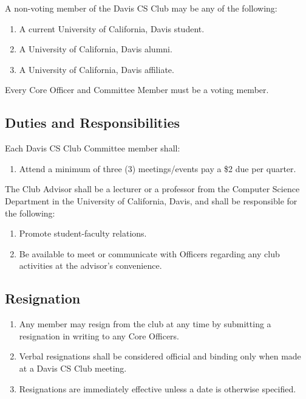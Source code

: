 \documentclass{article}
\newenvironment{li}{
\begin{enumerate}
  \setlength{\itemsep}{1pt}
  \setlength{\parskip}{0pt}
  \setlength{\parsep}{0pt}
}{\end{enumerate}}
\begin{document}
\noindent A non-voting member of the Davis CS Club may be any of the following:
\begin{li}
\item A current University of California, Davis student.
\item A University of California, Davis alumni.
\item A University of California, Davis affiliate.
\end{li}

\noindent Every Core Officer and Committee Member must be a voting member.

\subsection{Duties and Responsibilities}
Each Davis CS Club Committee member shall:
\begin{li}
\item Attend a minimum of three (3) meetings/events pay a \$2 due per quarter.
\end{li}

\noindent The Club Advisor shall be a lecturer or a professor from the Computer Science Department in the University of California, Davis, and shall be responsible for the following:
	\begin{li}
	\item Promote student-faculty relations.
	\item Be available to meet or communicate with Officers regarding any club activities at the advisor's convenience.
	\end{li}

\subsection{Resignation}
\begin{li}
\item Any member may resign from the club at any time by submitting a resignation in writing to any Core Officers.
\item Verbal resignations shall be considered official and binding only when made at a Davis CS Club meeting.
\item Resignations are immediately effective unless a date is otherwise specified.
\end{li}

\end{document}

